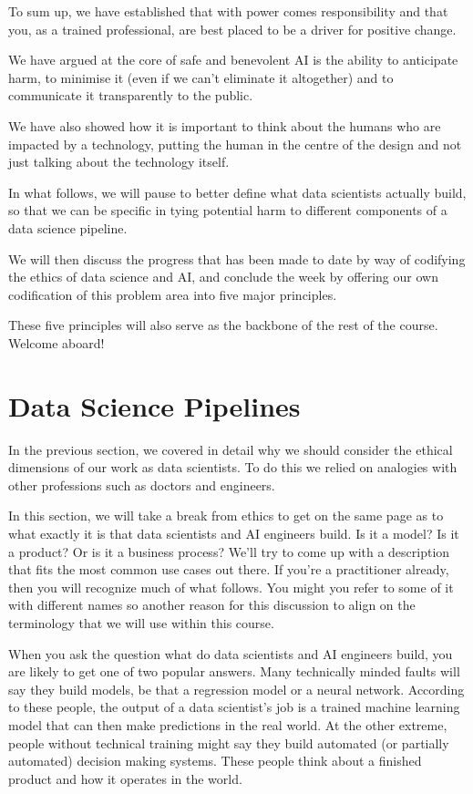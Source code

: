 \documentclass[
]{book}
\theoremstyle{definition}
\theoremstyle{definition}
\theoremstyle{definition}
\theoremstyle{definition}
\theoremstyle{remark}
\begin{document}
To sum up, we have established that with power comes responsibility and that you, as a trained professional, are best placed to be a driver for positive change.

We have argued at the core of safe and benevolent AI is the ability to anticipate
harm, to minimise it (even if we can't eliminate it altogether) and to communicate it transparently to the public.

We have also showed how it is important to think about the humans who are impacted by a technology, putting the human in the centre of the design and
not just talking about the technology itself.

In what follows, we will pause to better define what data scientists actually build, so that we can be specific in tying potential harm to different components of a data science pipeline.

We will then discuss the progress that has been made to date by way of codifying the ethics of data science and AI, and conclude the week by offering our own codification of this problem area into five major principles.

These five principles will also serve as the backbone of the rest of the course. Welcome aboard!

\hypertarget{data-science-pipelines}{%
\section{Data Science Pipelines}\label{data-science-pipelines}}

In the previous section, we covered in detail why we should consider the ethical dimensions of our work as data scientists. To do this we relied on analogies with other professions such as doctors and engineers.

In this section, we will take a break from ethics to get on the same page as to what exactly it is that data scientists and AI engineers build. Is it a model? Is it a product? Or is it a business process? We'll try to come up with a description that fits the most common use cases out there. If you're a practitioner already, then you will recognize much of what follows. You might you refer to some of it with different names so another reason for this discussion to align on the terminology that we will use within this course.

When you ask the question what do data scientists and AI engineers build, you are likely to get one of two popular answers. Many technically minded faults will say they build models, be that a regression model or a neural network. According to these people, the output of a data scientist's job is a trained machine learning model that can then make predictions in the real world. At the other extreme, people without technical training might say they build automated (or partially automated) decision making systems. These people think about a finished product and how it operates in the world.
\end{document}
